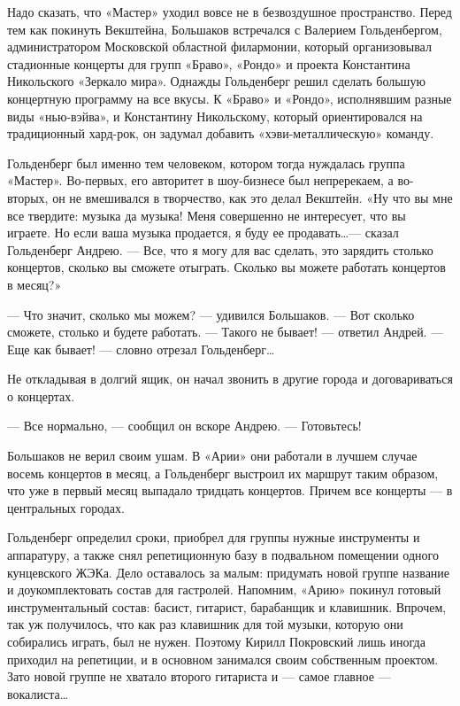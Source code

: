 \documentclass[16pt,a5paper,oneside]{book}
\begin{document}
Надо сказать, что «Мастер» уходил вовсе не в безвоздушное пространство. Перед тем как покинуть Векштейна, Большаков
встречался с Валерием Гольденбергом, администратором Московской областной филармонии, который организовывал стадионные
концерты для групп «Браво», «Рондо» и проекта Константина Никольского «Зеркало мира». Однажды Гольденберг решил сделать
большую концертную программу на все вкусы. К «Браво» и «Рондо», исполнявшим разные виды «нью-вэйва», и Константину
Никольскому, который ориентировался на традиционный хард-рок, он задумал добавить «хэви-металлическую» команду.

Гольденберг был именно тем человеком, котором тогда нуждалась группа «Мастер». Во-первых, его авторитет в шоу-бизнесе
был непререкаем, а во-вторых, он не вмешивался в творчество, как это делал Векштейн. «Ну что вы мне все твердите: музыка
да музыка! Меня совершенно не интересует, что вы играете. Но если ваша музыка продается, я буду ее продавать\ldots —
сказал Гольденберг Андрею. — Все, что я могу для вас сделать, это зарядить столько концертов, сколько вы сможете
отыграть. Сколько вы можете работать концертов в месяц?»

— Что значит, сколько мы можем? — удивился Большаков.
— Вот сколько сможете, столько и будете работать.
— Такого не бывает! — ответил Андрей.
— Еще как бывает! — словно отрезал Гольденберг\ldots

Не откладывая в долгий ящик, он начал звонить в другие города и договариваться о концертах.

— Все нормально, — сообщил он вскоре Андрею. — Готовьтесь!

Большаков не верил своим ушам. В «Арии» они работали в лучшем случае восемь концертов в месяц, а Гольденберг выстроил их
маршрут таким образом, что уже в первый месяц выпадало тридцать концертов. Причем все концерты — в центральных городах.

Гольденберг определил сроки, приобрел для группы нужные инструменты и аппаратуру, а также снял репетиционную базу в
подвальном помещении одного кунцевского ЖЭКа. Дело оставалось за малым: придумать новой группе название и
доукомплектовать состав для гастролей. Напомним, «Арию» покинул готовый инструментальный состав: басист, гитарист,
барабанщик и клавишник. Впрочем, так уж получилось, что как раз клавишник для той музыки, которую они собирались играть,
был не нужен. Поэтому Кирилл Покровский лишь иногда приходил на репетиции, и в основном занимался своим собственным
проектом. Зато новой группе не хватало второго гитариста и — самое главное — вокалиста\ldots
\end{document}
